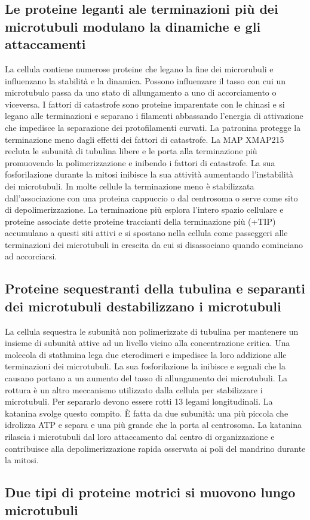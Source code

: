 \subsection{Le proteine leganti ale terminazioni pi\`u dei microtubuli modulano la dinamiche e gli attaccamenti}
La cellula contiene numerose proteine che legano la fine dei microrubuli e influenzano la stabilit\`a e la dinamica. Possono influenzare il tasso con cui un microtubulo passa da uno
stato di allungamento a uno di accorciamento o viceversa. I fattori di catastrofe sono proteine imparentate con le chinasi e si legano alle terminazioni e separano i filamenti abbassando
l'energia di attivazione che impedisce la separazione dei protofilamenti curvati. La patronina protegge la terminazione meno dagli effetti dei fattori di catastrofe. La MAP
XMAP215 recluta le subunit\`a di tubulina libere e le porta alla terminazione pi\`u promuovendo la polimerizzazione e inibendo i fattori di catastrofe. La sua fosforilazione durante
la mitosi inibisce la sua attivit\`a aumentando l'instabilit\`a dei microtubuli. In molte cellule la terminazione meno \`e stabilizzata dall'associazione con una proteina cappuccio o
dal centrosoma o serve come sito di depolimerizzazione. La terminazione pi\`u esplora l'intero spazio cellulare e proteine associate dette proteine traccianti della terminazione pi\`u
(+TIP) accumulano a questi siti attivi e si spostano nella cellula come passeggeri alle terminazioni dei microtubuli in crescita da cui si disassociano quando cominciano ad accorciarsi.
\subsection{Proteine sequestranti della tubulina e separanti dei microtubuli destabilizzano i microtubuli}
La cellula sequestra le subunit\`a non polimerizzate di tubulina per mantenere un insieme di subunit\`a attive ad un livello vicino alla concentrazione critica. Una molecola di stathmina
lega due eterodimeri e impedisce la loro addizione alle terminazioni dei microtubuli. La sua fosforilazione la inibisce e segnali che la causano portano a un aumento del tasso di 
allungamento dei microtubuli. La rottura \`e un altro meccanismo utilizzato dalla cellula per stabilizzare i microtubuli. Per separarlo devono essere rotti 13 legami longitudinali. La
katanina svolge questo compito. \`E fatta da due subunit\`a: una pi\`u piccola che idrolizza ATP e separa e una pi\`u grande che la porta al centrosoma. La katanina rilascia i 
microtubuli dal loro attaccamento dal centro di organizzazione e contribuisce alla depolimerizzazione rapida osservata ai poli del mandrino durante la mitosi. 
\subsection{Due tipi di proteine motrici si muovono lungo microtubuli}


